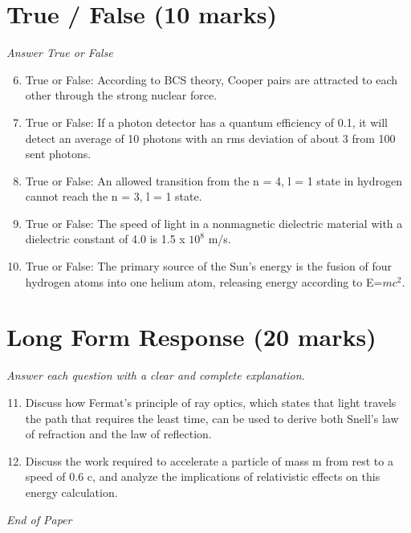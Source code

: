 \documentclass[12pt]{article}
\begin{document}
\section*{True / False (10 marks)}
\textit{Answer True or False}
\begin{enumerate}[label=\arabic*.]
\setcounter{enumi}{5}
\item True or False: According to BCS theory, Cooper pairs are attracted to each other through the strong nuclear force.
\item True or False: If a photon detector has a quantum efficiency of 0.1, it will detect an average of 10 photons with an rms deviation of about 3 from 100 sent photons.
\item True or False: An allowed transition from the n = 4, l = 1 state in hydrogen cannot reach the n = 3, l = 1 state.
\item True or False: The speed of light in a nonmagnetic dielectric material with a dielectric constant of 4.0 is 1.5 x $10^8$ m/s.
\item True or False: The primary source of the Sun's energy is the fusion of four hydrogen atoms into one helium atom, releasing energy according to E=$mc^2$.
\end{enumerate}

\section*{Long Form Response (20 marks)}
\textit{Answer each question with a clear and complete explanation.}
\begin{enumerate}[label=\arabic*.]
\setcounter{enumi}{10}
\item Discuss how Fermat's principle of ray optics, which states that light travels the path that requires the least time, can be used to derive both Snell's law of refraction and the law of reflection.
\item Discuss the work required to accelerate a particle of mass m from rest to a speed of 0.6 c, and analyze the implications of relativistic effects on this energy calculation.
\end{enumerate}

\vfill
\noindent\textit{End of Paper}
\end{document}
